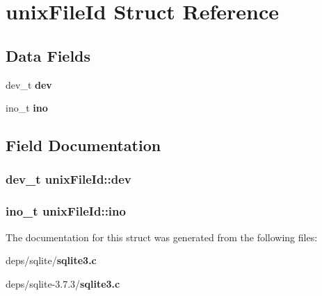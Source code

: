 \section{unix\-File\-Id Struct Reference}
\label{structunixFileId}
\subsection*{Data Fields}
\begin{CompactItemize}
\item 
dev\_\-t \bf{dev}
\item 
ino\_\-t \bf{ino}
\end{CompactItemize}


\subsection{Field Documentation}
\subsubsection{\setlength{\rightskip}{0pt plus 5cm}dev\_\-t \bf{unix\-File\-Id::dev}}\label{structunixFileId_f8dd1cd256be520a7ce4d7cc809d848d}


\subsubsection{\setlength{\rightskip}{0pt plus 5cm}ino\_\-t \bf{unix\-File\-Id::ino}}\label{structunixFileId_6c9be1cc787dd82a1e38cdd3cd484d4b}




The documentation for this struct was generated from the following files:\begin{CompactItemize}
\item 
deps/sqlite/\bf{sqlite3.c}\item 
deps/sqlite-3.7.3/\bf{sqlite3.c}\end{CompactItemize}
